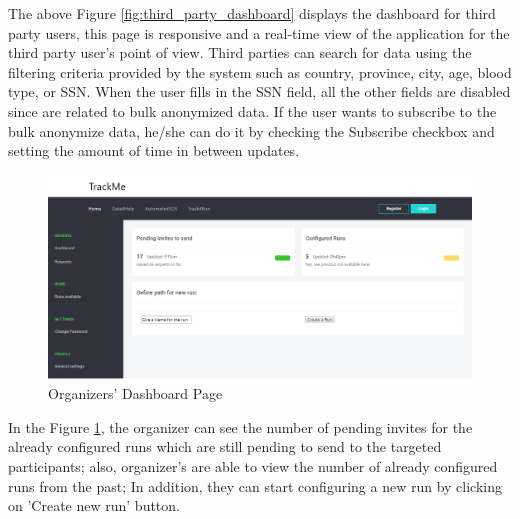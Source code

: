 \documentclass[a4paper, hidelinks, 12pt]{report}
\begin{document}
	The above Figure \ref{fig:third_party_dashboard} displays the dashboard for third party users, this page is responsive and a real-time view of the application for the third party user's point of view. Third parties can search for  data using the filtering criteria provided by the system such as country, province, city, age, blood type, or SSN. When the user fills in the SSN field, all the other fields are disabled since are related to bulk anonymized data. If the user wants to subscribe to the bulk anonymize data, he/she can do it by checking the Subscribe checkbox and setting the amount of time in between updates.	
	
	\begin{figure}[H]
		\centering
		\includegraphics[width=1\textwidth]{UI/db_organizer1.png}
		\caption[UI: Organizers' Dashboard Page]{Organizers' Dashboard Page}
		\label{fig:organizer_dashboard_1}
	\end{figure}
	In the Figure \ref{fig:organizer_dashboard_1}, the organizer can see the number of pending invites for the already configured runs which are still pending to send to the targeted participants; also, organizer's are able to view the number of already configured runs from the past; In addition, they can start configuring a new run by clicking on 'Create new run' button.
	
\end{document}
